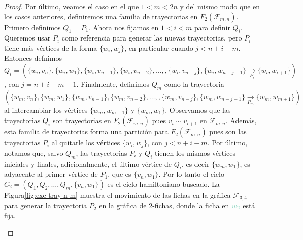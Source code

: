 \begin{proof}
Por \'ultimo, veamos el caso en el que $1<m<2n$ y del mismo modo que en los
casos anteriores, definiremos una familia de trayectorias en
$F_2(\mathcal{F}_{m,n})$. Primero definimos $Q_1 =P_1$. Ahora nos fijamos en
$1<i<m$ para definir $Q_i$. Queremos usar $P_i$ como referencia para generar las
nuevas trayectorias, pero $P_i$ tiene m\'as v\'ertices de la forma
$\{w_i,w_j\}$, en particular cuando $j< n+i-m$. Entonces defnimos $Q_i =
(\{w_i,v_n\},\{w_i,w_1\},\{w_i,v_{n-1}\},\{w_i,v_{n-2}\}, \dots,
,\{w_i,v_{n-j}\},\{w_i,w_{n-j-1}\}\xrightarrow[P_i]{}\{w_i,w_{i+1}\})$, con $j =
n+i-m-1$. Finalmente, definimos $Q_m$ como la trayectoria
$(\{w_m,v_n\},\{w_m,w_1\},\{w_m,v_{n-1}\},\{w_m,v_{n-2}\}, \dots,
,\{w_m,v_{n-j}\},\{w_m,w_{n-j-1}\}\xrightarrow[P_m]{}\{w_m,w_{m+1}\})$ al
intercambiar los v\'ertices $\{w_m,w_{m+1}\}$ y $\{w_m,w_1\}$. Observamos que
las trayectorias $Q_i$ son trayectorias en $F_2(\mathcal{F}_{m,n})$ pues $v_i
\sim v_{i+1}$ en $\mathcal{F}_{m,n}$. Adem\'as, esta familia de trayectorias
forma una partici\'on para $F_2(\mathcal{F}_{m,n})$ pues son las trayectorias
$P_i$ al quitarle los v\'ertices $\{w_i,w_j\}$, con $j< n+i-m$. Por \'ultimo,
notamos que, salvo $Q_m$, las trayectorias $P_i$ y $Q_i$ tienen los mismos
v\'ertices iniciales y finales, adicionalmente, el \'ultimo v\'ertice de $Q_i$,
es decir $\{w_m,w_1\}$, es adyacente al primer v\'ertice de $P_1$, que es
$\{v_n,w_1\}$. Por lo tanto el ciclo $C_2=(Q_1,Q_2, \dots, Q_m, \{v_n,w_1\})$ es
el ciclo hamiltoniano buscado. La Figura\ref{fig:exe-tray-n-m} muestra el
movimiento de las fichas en la gr\'afica $\mathcal{F}_{3,4}$ para generar la
trayectoria $P_2$ en la gr\'afica de $2$-fichas, donde la ficha en
${\color{azulClaro}w_2}$ est\'a fija.


\begin{figure}[ht!]
    \centering
\end{figure}
\end{proof}
